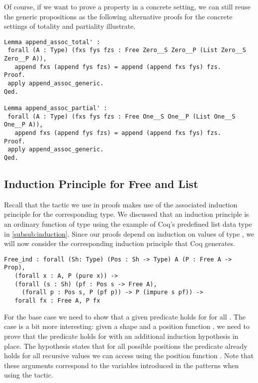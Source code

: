 Of course, if we want to prove a property in a concrete setting, we can still reuse the generic propositions as the following alternative proofs for the concrete settings of totality and partiality illustrate.

\begin{verbatim}
Lemma append_assoc_total' :
 forall (A : Type) (fxs fys fzs : Free Zero__S Zero__P (List Zero__S Zero__P A)),
   append fxs (append fys fzs) = append (append fxs fys) fzs.
Proof.
 apply append_assoc_generic.
Qed.

Lemma append_assoc_partial' :
 forall (A : Type) (fxs fys fzs : Free One__S One__P (List One__S One__P A)),
   append fxs (append fys fzs) = append (append fxs fys) fzs.
Proof.
 apply append_assoc_generic.
Qed.
\end{verbatim}

\subsection{Induction Principle for Free and List}

Recall that the  tactic we use in proofs makes use of the associated induction principle for the corresponding type.
We discussed that an induction principle is an ordinary function of type  using the example of Coq's predefined list data type in \autoref{subsub:induction}.
Since our proofs depend on induction on values of type , we will now consider the corresponding induction principle that Coq generates.

\begin{verbatim}
Free_ind : forall (Sh: Type) (Pos : Sh -> Type) A (P : Free A -> Prop),
   (forall x : A, P (pure x)) ->
   (forall (s : Sh) (pf : Pos s -> Free A),
     (forall p : Pos s, P (pf p)) -> P (impure s pf)) ->
   forall fx : Free A, P fx
\end{verbatim}

For the base case we need to show that a given predicate  holds for  for all .
The  case is a bit more interesting: given a shape  and a position function , we need to prove that the predicate holds for  with an additional induction hypothesis in place.
The hypothesis states that for all possible positions  the predicate already holds for all recursive values we can access using the position function .
Note that these arguments correspond to the variables introduced in the patterns when using the  tactic.

